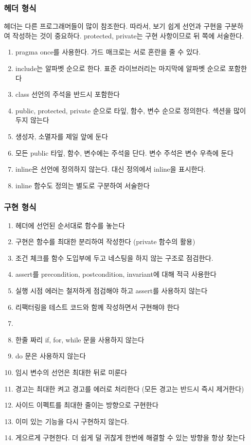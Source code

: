 \documentclass[chapter,kosection, 10.5pt, romanfixed, a4paper]{oblivoir}
\begin{document}
\subsubsection{헤더 형식}

헤더는 다른 프로그래머들이 많이 참조한다. 따라서, 보기 쉽게 선언과 구현을 구분하여 
작성하는 것이 중요하다. protected, private는 구현 사항이므로 뒤 쪽에 서술한다. 

\begin{enumerate}
\item pragma once를 사용한다. 가드 매크로는 서로 혼란을 줄 수 있다. 
\item include는 알파벳 순으로 한다. 표준 라이브러리는 마지막에 알파벳 순으로 포함한다
\item class 선언의 주석을 반드시 포함한다
\item public, protected, private 순으로 타잎, 함수, 변수 순으로 정의한다. 섹션을 많이 두지 않는다
\item 생성자, 소멸자를 제일 앞에 둔다
\item 모든 public 타잎, 함수, 변수에는 주석을 단다. 변수 주석은 변수 우측에 둔다
\item inline은 선언에 정의하지 않는다. 대신 정의에서 inline을 표시한다. 
\item inline 함수도 정의는 별도로 구분하여 서술한다
\end{enumerate}

\subsubsection{구현 형식}

\begin{enumerate}
\item 헤더에 선언된 순서대로 함수를 놓는다
\item 구현은 함수를 최대한 분리하여 작성한다 (private 함수의 활용)
\item 조건 체크를 함수 도입부에 두고 네스팅을 하지 않는 구조로 점검한다. 
\item assert를 precondition, postcondition, invariant에 대해 적극 사용한다
\item 실행 시점 에러는 철저하게 점검해야 하고 assert를 사용하지 않는다
\item 리팩터링을 테스트 코드와 함께 작성하면서 구현해야 한다
\item %
\item 한줄 짜리 if, for, while 문을 사용하지 않는다
\item do 문은 사용하지 않는다
\item 임시 변수의 선언은 최대한 뒤로 미룬다
\item 경고는 최대한 켜고 경고를 에러로 처리한다 (모든 경고는 반드시 즉시 제거한다)
\item 사이드 이펙트를 최대한 줄이는 방향으로 구현한다
\item 이미 있는 기능을 다시 구현하지 않는다. 
\item 게으르게 구현한다. 더 쉽게 덜 귀찮게 한번에 해결할 수 있는 방향을 항상 찾는다
\end{enumerate}
\end{document}
